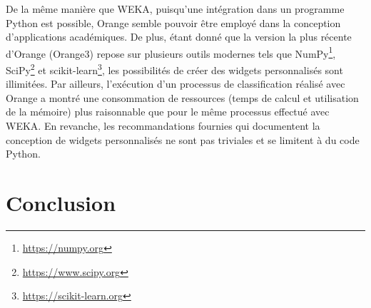 De la même manière que WEKA, puisqu'une intégration dans un programme Python est possible, Orange semble pouvoir être employé dans la conception d'applications académiques. De plus, étant donné que la version la plus récente d'Orange (Orange3) repose sur plusieurs outils modernes tels que NumPy\footnote{\url{https://numpy.org}}, SciPy\footnote{\url{https://www.scipy.org}} et scikit-learn\footnote{\url{https://scikit-learn.org}}, les possibilités de créer des widgets personnalisés sont illimitées. Par ailleurs, l'exécution d'un processus de classification réalisé avec Orange a montré une consommation de ressources (temps de calcul et utilisation de la mémoire) plus raisonnable que pour le même processus effectué avec \acs{WEKA}. En revanche, les recommandations fournies qui documentent la conception de widgets personnalisés ne sont pas triviales et se limitent à du code Python.

\section{Conclusion}

